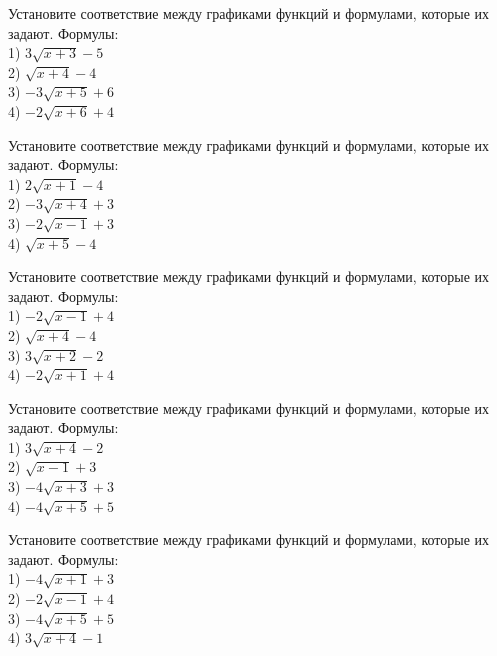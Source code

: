 \documentclass[4apaper]{article}
\begin{document}
\begin{taskBN}{16}
Установите соответствие между графиками функций и формулами, которые их задают. Формулы: \\1) $3\sqrt{x+3}-5$\\2) $\sqrt{x+4}-4$\\3) $-3\sqrt{x+5}+6$\\4) $-2\sqrt{x+6}+4$
\end{taskBN}

\begin{taskBN}{17}
Установите соответствие между графиками функций и формулами, которые их задают. Формулы: \\1) $2\sqrt{x+1}-4$\\2) $-3\sqrt{x+4}+3$\\3) $-2\sqrt{x-1}+3$\\4) $\sqrt{x+5}-4$
\end{taskBN}

\begin{taskBN}{18}
Установите соответствие между графиками функций и формулами, которые их задают. Формулы: \\1) $-2\sqrt{x-1}+4$\\2) $\sqrt{x+4}-4$\\3) $3\sqrt{x+2}-2$\\4) $-2\sqrt{x+1}+4$
\end{taskBN}

\begin{taskBN}{19}
Установите соответствие между графиками функций и формулами, которые их задают. Формулы: \\1) $3\sqrt{x+4}-2$\\2) $\sqrt{x-1}+3$\\3) $-4\sqrt{x+3}+3$\\4) $-4\sqrt{x+5}+5$
\end{taskBN}

\begin{taskBN}{20}
Установите соответствие между графиками функций и формулами, которые их задают. Формулы: \\1) $-4\sqrt{x+1}+3$\\2) $-2\sqrt{x-1}+4$\\3) $-4\sqrt{x+5}+5$\\4) $3\sqrt{x+4}-1$
\end{taskBN}
\end{document}
